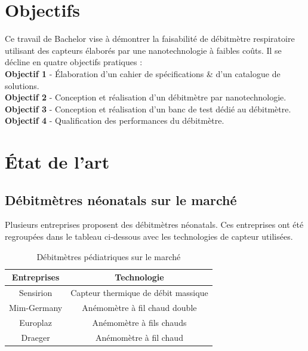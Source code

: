 \section{Objectifs}
Ce travail de Bachelor vise à démontrer la faisabilité de débitmètre respiratoire utilisant des capteurs élaborés par une nanotechnologie à 
faibles coûts. Il se décline en quatre objectifs pratiques : \\
\vspace{0.2cm}
\textbf{Objectif 1} - Élaboration d'un cahier de spécifications \& d'un catalogue de solutions. \\
\vspace{0.2cm}
\textbf{Objectif 2} - Conception et réalisation d'un débitmètre par nanotechnologie. \\
\vspace{0.2cm}
\textbf{Objectif 3} - Conception et réalisation d'un banc de test dédié au débitmètre.\\
\vspace{0.2cm}
\textbf{Objectif 4} - Qualification des performances du débitmètre.

\section{État de l'art}
\subsection{Débitmètres néonatals sur le marché}
Plusieurs entreprises proposent des débitmètres néonatals. Ces entreprises ont été regroupées dans le tableau ci-dessous avec les 
technologies de capteur utilisées. \\
\begin{table}[H]
    \centering
    \begin{tabular}{|c|c|}
        \hline
        \textbf{Entreprises} & \textbf{Technologie}                \\
        \hline
        Sensirion            & Capteur thermique de débit massique \\
        \hline
        Mim-Germany          & Anémomètre à fil chaud double       \\
        \hline
        Europlaz             & Anémomètre à fils chauds            \\
        \hline
        Draeger              & Anémomètre à fil chaud              \\
        \hline
    \end{tabular}
    \caption{Débitmètres pédiatriques sur le marché}
    \label{tab:debitmetreMarche}
\end{table}


